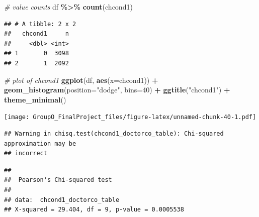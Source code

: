 \documentclass[
]{article}
\newenvironment{Shaded}{\begin{snugshade}}{\end{snugshade}}
\newcommand{\AttributeTok}[1]{\textcolor[rgb]{0.13,0.29,0.53}{#1}}
\newcommand{\CommentTok}[1]{\textcolor[rgb]{0.56,0.35,0.01}{\textit{#1}}}
\newcommand{\DecValTok}[1]{\textcolor[rgb]{0.00,0.00,0.81}{#1}}
\newcommand{\FunctionTok}[1]{\textcolor[rgb]{0.13,0.29,0.53}{\textbf{#1}}}
\newcommand{\NormalTok}[1]{#1}
\newcommand{\OtherTok}[1]{\textcolor[rgb]{0.56,0.35,0.01}{#1}}
\newcommand{\SpecialCharTok}[1]{\textcolor[rgb]{0.81,0.36,0.00}{\textbf{#1}}}
\newcommand{\StringTok}[1]{\textcolor[rgb]{0.31,0.60,0.02}{#1}}
\begin{document}
\begin{Shaded}
\begin{Highlighting}[]
\CommentTok{\# value counts}
\NormalTok{df }\SpecialCharTok{\%\textgreater{}\%} \FunctionTok{count}\NormalTok{(chcond1)}
\end{Highlighting}
\end{Shaded}

\begin{verbatim}
## # A tibble: 2 x 2
##   chcond1     n
##     <dbl> <int>
## 1       0  3098
## 2       1  2092
\end{verbatim}

\begin{Shaded}
\begin{Highlighting}[]
\CommentTok{\# plot of chcond1}
\FunctionTok{ggplot}\NormalTok{(df, }\FunctionTok{aes}\NormalTok{(}\AttributeTok{x=}\NormalTok{chcond1)) }\SpecialCharTok{+}
  \FunctionTok{geom\_histogram}\NormalTok{(}\AttributeTok{position=}\StringTok{"dodge"}\NormalTok{, }\AttributeTok{bins=}\DecValTok{40}\NormalTok{) }\SpecialCharTok{+}
  \FunctionTok{ggtitle}\NormalTok{(}\StringTok{"chcond1"}\NormalTok{) }\SpecialCharTok{+}
  \FunctionTok{theme\_minimal}\NormalTok{()}
\end{Highlighting}
\end{Shaded}

\texttt{[image: GroupO\_FinalProject\_files/figure-latex/unnamed-chunk-40-1.pdf]}

\begin{Shaded}
\end{Shaded}

\begin{verbatim}
## Warning in chisq.test(chcond1_doctorco_table): Chi-squared approximation may be
## incorrect
\end{verbatim}

\begin{verbatim}
## 
##  Pearson's Chi-squared test
## 
## data:  chcond1_doctorco_table
## X-squared = 29.404, df = 9, p-value = 0.0005538
\end{verbatim}
\end{document}
